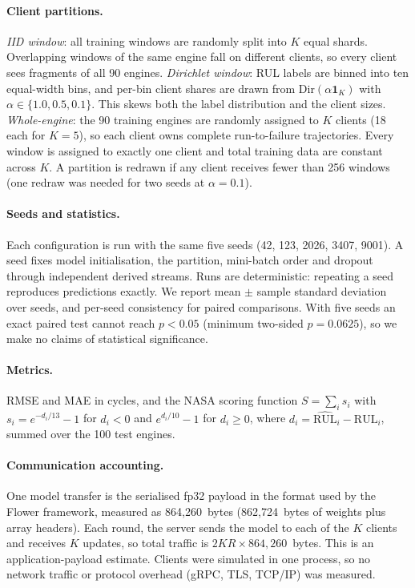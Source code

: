 \paragraph{Client partitions.}
\emph{IID window}: all training windows are randomly split into $K$ equal shards.
Overlapping windows of the same engine fall on different clients, so every
client sees fragments of all 90 engines.
\emph{Dirichlet window}: RUL labels are binned into ten equal-width bins, and
per-bin client shares are drawn from $\mathrm{Dir}(\alpha\mathbf{1}_K)$ with
$\alpha\in\{1.0,0.5,0.1\}$. This skews both the label distribution and the
client sizes.
\emph{Whole-engine}: the 90 training engines are randomly assigned to $K$
clients (18 each for $K=5$), so each client owns complete run-to-failure
trajectories. Every window is assigned to exactly one client and total training
data are constant across $K$. A partition is redrawn if any client receives fewer
than 256 windows (one redraw was needed for two seeds at $\alpha=0.1$).

\paragraph{Seeds and statistics.}
Each configuration is run with the same five seeds (42, 123, 2026, 3407, 9001).
A seed fixes model initialisation, the partition, mini-batch order and dropout
through independent derived streams. Runs are deterministic: repeating a seed
reproduces predictions exactly. We report mean $\pm$ sample standard deviation
over seeds, and per-seed consistency for paired comparisons. With five seeds an
exact paired test cannot reach $p<0.05$ (minimum two-sided $p=0.0625$), so we
make no claims of statistical significance.

\paragraph{Metrics.}
RMSE and MAE in cycles, and the NASA scoring function
$S=\sum_i s_i$ with $s_i=e^{-d_i/13}-1$ for $d_i<0$ and $e^{d_i/10}-1$ for
$d_i\ge0$, where $d_i=\widehat{\mathrm{RUL}}_i-\mathrm{RUL}_i$, summed over the 100
test engines.

\paragraph{Communication accounting.}
One model transfer is the serialised fp32 payload in the format used by the
Flower framework, measured as 864{,}260~bytes (862{,}724~bytes of weights plus
array headers). Each round, the server sends the model to each of the $K$ clients
and receives $K$ updates, so total traffic is $2KR\times864{,}260$~bytes. This
is an application-payload estimate. Clients were simulated in one process, so no
network traffic or protocol overhead (gRPC, TLS, TCP/IP) was measured.

